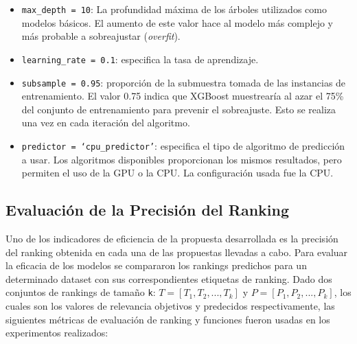 \begin{description}
\begin{itemize}
		\item \texttt{max\_depth = 10}: La profundidad máxima de los árboles utilizados como modelos básicos. El aumento de este valor hace al modelo más complejo y más probable a sobreajustar (\textit{overfit}).
		\item \texttt{learning\_rate = 0.1}: especifica la tasa de aprendizaje.
		\item \texttt{subsample = 0.95}: proporción de la submuestra tomada de las instancias de entrenamiento. El valor 0.75 indica que XGBoost muestrearía al azar el 75\% del conjunto de entrenamiento para prevenir el sobreajuste. Esto se realiza una vez en cada iteración del algoritmo.
 		\item \texttt{predictor = `cpu\_predictor'}: especifica el tipo de algoritmo de predicción a usar. Los algoritmos disponibles proporcionan los mismos resultados, pero permiten el uso de la GPU o la CPU. La configuración usada fue la CPU.
	\end{itemize}
\end{description}


\subsection{Evaluación de la Precisión del Ranking}\label{subsec:ranking}

%
%
%

Uno de los indicadores de eficiencia de la propuesta desarrollada es la precisión del ranking obtenida en cada una de las propuestas llevadas a cabo. Para evaluar la eficacia de los modelos se compararon los rankings predichos para un determinado dataset con sus correspondientes etiquetas de ranking. Dado dos conjuntos de rankings de tamaño \texttt{k}: $T = [T_1, T_2, ..., T_k]$ y $P = [P_1, P_2, ..., P_k]$, los cuales son los valores de relevancia objetivos y predecidos respectivamente, las siguientes métricas de evaluación de ranking y funciones fueron usadas en los experimentos realizados:

